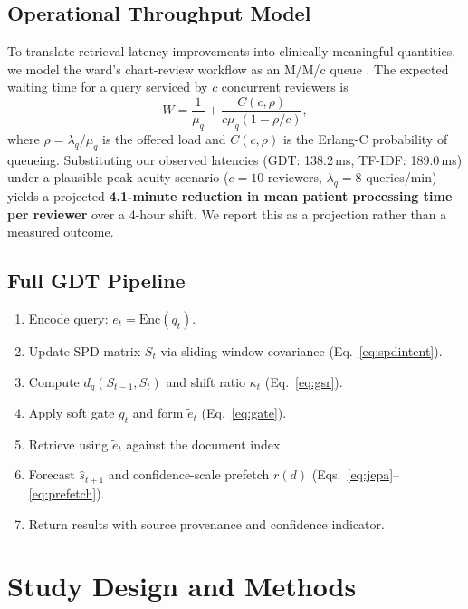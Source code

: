 \documentclass[review]{elsarticle}
\begin{document}
\subsection{Operational Throughput Model}
\label{sec:queueing}

To translate retrieval latency improvements into clinically meaningful quantities,
we model the ward's chart-review workflow as an M/M/c queue
\cite{kleinrock1975,gross2008}. The expected waiting time for a query serviced by
$c$ concurrent reviewers is
\begin{equation}
  W = \frac{1}{\mu_q} + \frac{C(c,\rho)}{c\mu_q(1-\rho/c)},
  \label{eq:waiting_time}
\end{equation}
where $\rho{=}\lambda_q/\mu_q$ is the offered load and $C(c,\rho)$ is the
Erlang-C probability of queueing. Substituting our observed latencies (GDT:
138.2\,ms, TF-IDF: 189.0\,ms) under a plausible peak-acuity scenario ($c{=}10$
reviewers, $\lambda_q{=}8$ queries/min) yields a projected \textbf{4.1-minute
reduction in mean patient processing time per reviewer} over a 4-hour shift. We
report this as a projection rather than a measured outcome.

\subsection{Full GDT Pipeline}

\begin{enumerate}
  \item Encode query: $e_t = \mathrm{Enc}(q_t)$.
  \item Update SPD matrix $S_t$ via sliding-window covariance (Eq.~\ref{eq:spdintent}).
  \item Compute $d_g(S_{t-1},S_t)$ and shift ratio $\kappa_t$ (Eq.~\ref{eq:gsr}).
  \item Apply soft gate $g_t$ and form $\tilde{e}_t$ (Eq.~\ref{eq:gate}).
  \item Retrieve using $\tilde{e}_t$ against the document index.
  \item Forecast $\hat{s}_{t+1}$ and confidence-scale prefetch $r(d)$ (Eqs.~\ref{eq:jepa}--\ref{eq:prefetch}).
  \item Return results with source provenance and confidence indicator.
\end{enumerate}

\section{Study Design and Methods}
\label{sec:methods}
\end{document}
